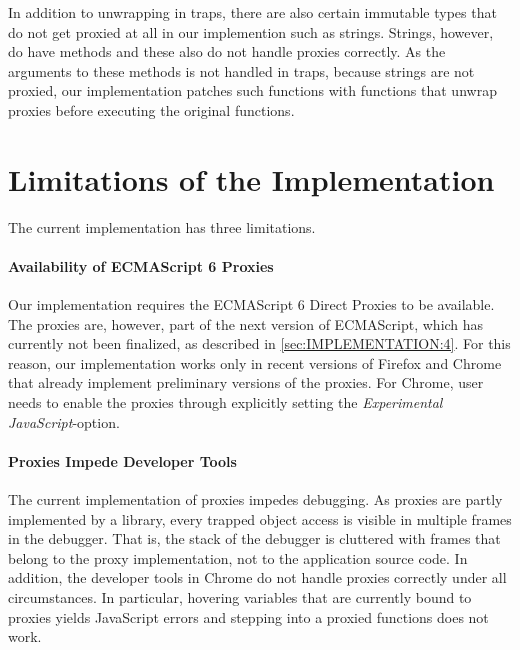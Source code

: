 In addition to unwrapping in traps, there are also certain immutable types that do not get proxied at all in our implemention such as strings.
Strings, however, do have methods and these also do not handle proxies correctly.
As the arguments to these methods is not handled in traps, because strings are not proxied, our implementation patches such functions with functions that unwrap proxies before executing the original functions.





\section{Limitations of the Implementation}

The current implementation has three limitations.

\paragraph{Availability of ECMAScript 6 Proxies}
Our implementation requires the ECMAScript 6 Direct Proxies to be available.
The proxies are, however, part of the next version of ECMAScript, which has currently not been finalized, as described in \ref{sec:IMPLEMENTATION:4}.
For this reason, our implementation works only in recent versions of Firefox and Chrome that already implement preliminary versions of the proxies.
For Chrome, user needs to enable the proxies through explicitly setting the \emph{Experimental JavaScript}-option.

\paragraph{Proxies Impede Developer Tools}
The current implementation of proxies impedes debugging.
As proxies are partly implemented by a library, every trapped object access is visible in multiple frames in the debugger.
That is, the stack of the debugger is cluttered with frames that belong to the proxy implementation, not to the application source code.
In addition, the developer tools in Chrome do not handle proxies correctly under all circumstances.
In particular, hovering variables that are currently bound to proxies yields JavaScript errors and stepping into a proxied functions does not work.

